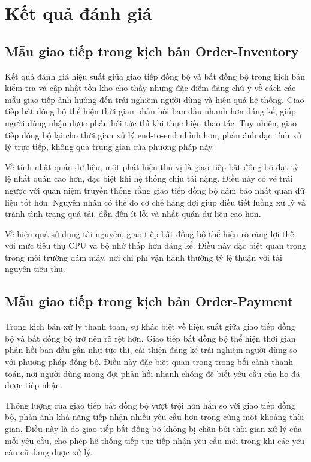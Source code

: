 \section{Kết quả đánh giá}

\subsection{Mẫu giao tiếp trong kịch bản Order-Inventory}
Kết quả đánh giá hiệu suất giữa giao tiếp đồng bộ và bất đồng bộ trong kịch bản kiểm tra và cập nhật tồn kho cho thấy những đặc điểm đáng chú ý về cách các mẫu giao tiếp ảnh hưởng đến trải nghiệm người dùng và hiệu quả hệ thống. Giao tiếp bất đồng bộ thể hiện thời gian phản hồi ban đầu nhanh hơn đáng kể, giúp người dùng nhận được phản hồi tức thì khi thực hiện thao tác. Tuy nhiên, giao tiếp đồng bộ lại cho thời gian xử lý end-to-end nhỉnh hơn, phản ánh đặc tính xử lý trực tiếp, không qua trung gian của phương pháp này.

Về tính nhất quán dữ liệu, một phát hiện thú vị là giao tiếp bất đồng bộ đạt tỷ lệ nhất quán cao hơn, đặc biệt khi hệ thống chịu tải nặng. Điều này có vẻ trái ngược với quan niệm truyền thống rằng giao tiếp đồng bộ đảm bảo nhất quán dữ liệu tốt hơn. Nguyên nhân có thể do cơ chế hàng đợi giúp điều tiết luồng xử lý và tránh tình trạng quá tải, dẫn đến ít lỗi và nhất quán dữ liệu cao hơn.

Về hiệu quả sử dụng tài nguyên, giao tiếp bất đồng bộ thể hiện rõ ràng lợi thế với mức tiêu thụ CPU và bộ nhớ thấp hơn đáng kể. Điều này đặc biệt quan trọng trong môi trường đám mây, nơi chi phí vận hành thường tỷ lệ thuận với tài nguyên tiêu thụ.

\subsection{Mẫu giao tiếp trong kịch bản Order-Payment}
Trong kịch bản xử lý thanh toán, sự khác biệt về hiệu suất giữa giao tiếp đồng bộ và bất đồng bộ trở nên rõ rệt hơn. Giao tiếp bất đồng bộ thể hiện thời gian phản hồi ban đầu gần như tức thì, cải thiện đáng kể trải nghiệm người dùng so với phương pháp đồng bộ. Điều này đặc biệt quan trọng trong bối cảnh thanh toán, nơi người dùng mong đợi phản hồi nhanh chóng để biết yêu cầu của họ đã được tiếp nhận.

Thông lượng của giao tiếp bất đồng bộ vượt trội hơn hẳn so với giao tiếp đồng bộ, phản ánh khả năng tiếp nhận nhiều yêu cầu hơn trong cùng một khoảng thời gian. Điều này là do giao tiếp bất đồng bộ không bị chặn bởi thời gian xử lý của mỗi yêu cầu, cho phép hệ thống tiếp tục tiếp nhận yêu cầu mới trong khi các yêu cầu cũ đang được xử lý.

